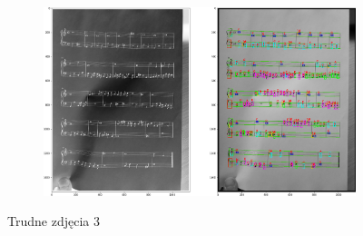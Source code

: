 \documentclass[12pt]{article}
\begin{document}
\begin{enumerate}
\begin{figure}
\begin{subfigure}[b]{0.48\linewidth}
				\end{subfigure}
				\begin{subfigure}[b]{0.48\linewidth}
					\includegraphics[width=\linewidth]{Hard/Zdj29.png}
				\end{subfigure}
				\label{fig:nuuty2}
				\caption{Trudne zdjęcia 3}
			\end{figure}
		

\end{enumerate}
\end{document}

